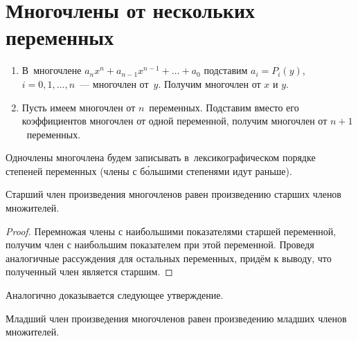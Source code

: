 \section{Многочлены от нескольких переменных}
\begin{enumerate}
	\item В~многочлене $a_n x^n + a_{n-1} x^{n-1} + \ldots + a_0$ подставим $a_i = P_i(y)$, $i = 0, 1, \ldots, n$~--- многочлен от~$y$.
	Получим многочлен от $x$ и $y$.
	
	\item Пусть имеем многочлен от $n$~переменных.
	Подставим вместо его коэффициентов многочлен от одной переменной, получим многочлен от $n + 1$~переменных.
\end{enumerate}

Одночлены многочлена будем записывать в~лексикографическом порядке степеней переменных (члены с б\'{о}ль\-ши\-ми степенями идут раньше).

\begin{statement}
Старший член произведения многочленов равен произведению старших членов множителей.
\end{statement}
\begin{proof}
Перемножая члены с наибольшими показателями старшей переменной, получим член с наибольшим показателем при этой переменной.
Проведя аналогичные рассуждения для остальных переменных, придём к выводу, что полученный член является старшим.
\end{proof}

Аналогично доказывается следующее утверждение.
\begin{statement}
Младший член произведения многочленов равен произведению младших членов множителей.
\end{statement}